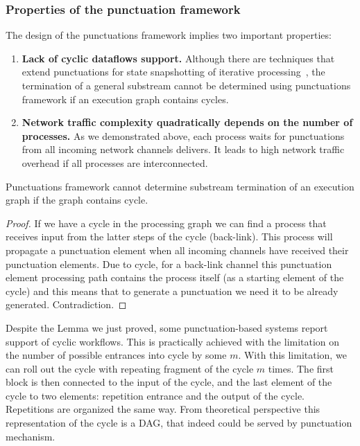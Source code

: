 \subsubsection{Properties of the punctuation framework}

The design of the punctuations framework implies two important properties:

\begin{enumerate}
    \item {\bf Lack of cyclic dataflows support.} Although there are techniques that extend punctuations for state snapshotting of iterative processing~\cite{Carbone:2017:SMA:3137765.3137777}, the termination of a general substream cannot be determined using punctuations framework if an execution graph contains cycles.
    \item {\bf Network traffic complexity quadratically depends on the number of processes.} As we demonstrated above, each process waits for punctuations from all incoming network channels delivers. It leads to high network traffic overhead if all processes are interconnected.
\end{enumerate}

\begin{lemma}
Punctuations framework cannot determine substream termination of an execution graph if the graph contains cycle.
\end{lemma}
\begin{proof}
If we have a cycle in the processing graph we can find a process that receives input from the latter steps of the cycle (back-link). This process will propagate a punctuation element when all incoming channels have received their punctuation elements. Due to cycle, for a back-link channel this punctuation element processing path contains the process itself (as a starting element of the cycle) and this means that to generate a punctuation we need it to be already generated. Contradiction.
\end{proof}

Despite the Lemma we just proved, some punctuation-based systems report support of cyclic workflows. This is practically achieved with the limitation on the number of possible entrances into cycle by some $m$. With this limitation, we can roll out the cycle with repeating fragment of the cycle $m$ times. The first block is then connected to the input of the cycle, and the last element of the cycle to two elements: repetition entrance and the output of the cycle. Repetitions are organized the same way. From theoretical perspective this representation of the cycle is a DAG, that indeed could be served by punctuation mechanism.


